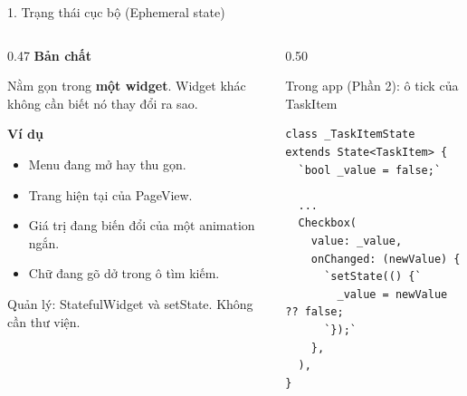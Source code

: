 \documentclass[aspectratio=169,11pt]{beamer}
\newcommand{\ma}[1]{{\ttfamily\small #1}}
\newcommand{\chot}[1]{%
  \par\vspace{2.5mm}%
  \colorbox{nenhop}{\parbox{\dimexpr\linewidth-2\fboxsep\relax}{\raggedright\small\color{chinh}#1}}}
\newcommand{\nhanma}[1]{{\scriptsize\color{xam}#1\par}\vspace{0.8mm}}
\begin{document}
\begin{frame}[fragile]{1. Trạng thái cục bộ (Ephemeral state)}
  \begin{columns}[T,onlytextwidth]
    \begin{column}{0.47\textwidth}
      \textbf{\color{chinh}Bản chất}\par\vspace{0.8mm}
      Nằm gọn trong \textbf{một widget}. Widget khác không cần biết nó thay đổi ra sao.
      \par\vspace{2.5mm}
      \textbf{\color{chinh}Ví dụ}
      \begin{itemize}
        \item Menu đang mở hay thu gọn.
        \item Trang hiện tại của \ma{PageView}.
        \item Giá trị đang biến đổi của một animation ngắn.
        \item Chữ đang gõ dở trong ô tìm kiếm.
      \end{itemize}
      \chot{Quản lý: \ma{StatefulWidget} và \ma{setState}. Không cần thư viện.}
    \end{column}
    \begin{column}{0.50\textwidth}
      \nhanma{Trong app (Phần 2): ô tick của \ma{\scriptsize TaskItem}}
\begin{lstlisting}
class _TaskItemState extends State<TaskItem> {
  `bool _value = false;`

  ...
  Checkbox(
    value: _value,
    onChanged: (newValue) {
      `setState(() {`
        _value = newValue ?? false;
      `});`
    },
  ),
}
\end{lstlisting}
    \end{column}
  \end{columns}
\end{frame}
\end{document}
